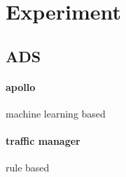 \section{Experiment}
\subsection{ADS}
\paragraph{apollo} machine learning based
\paragraph{traffic manager} rule based


 
 
